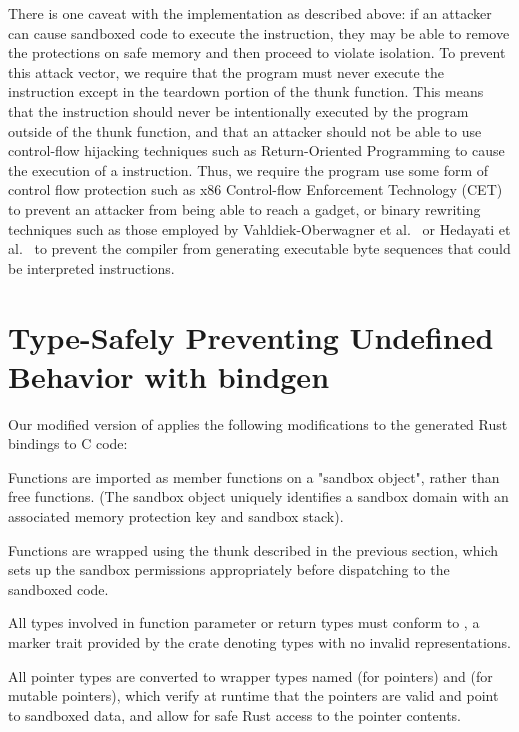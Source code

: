 There is one caveat with the implementation as described above: if an attacker can cause sandboxed
code to execute the  instruction, they may be able to remove the protections on safe
memory and then proceed to violate isolation. To prevent this attack vector, we require that the
program must never execute the  instruction except in the teardown portion of the thunk
function. This means that the instruction should never be intentionally executed by the program
outside of the thunk function, and that an attacker should not be able to use control-flow hijacking
techniques such as Return-Oriented Programming to cause the execution of a  instruction.
Thus, we require the program use some form of control flow protection such as x86 Control-flow
Enforcement Technology (CET) to prevent an attacker from being able to reach a  gadget,
or binary rewriting techniques such as those employed by Vahldiek-Oberwagner et
al.~\cite{vahldiek-oberwagner:erim} or Hedayati et al.~\cite{hedayati:hodor} to prevent the compiler
from generating executable byte sequences that could be interpreted  instructions.

\section{Type-Safely Preventing Undefined Behavior with bindgen}

Our modified version of  applies the following modifications to the generated Rust bindings to C code:

\squishlist
    \item Functions are imported as member functions on a "sandbox object", rather than free
        functions. (The sandbox object uniquely identifies a sandbox domain with an associated
        memory protection key and sandbox stack).
    \item Functions are wrapped using the thunk described in the previous section, which sets up the
        sandbox permissions appropriately before dispatching to the sandboxed code.
    \item All types involved in function parameter or return types must conform to
        , a marker trait provided by the  crate denoting types
        with no invalid representations.
    \item All pointer types are converted to wrapper types named  (for 
        pointers) and  (for mutable pointers), which verify at runtime that the
        pointers are valid and point to sandboxed data, and allow for safe Rust access to the
        pointer contents.
\squishend

